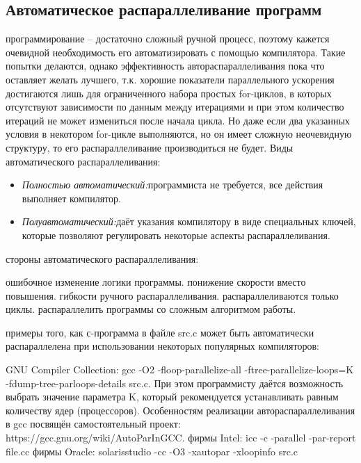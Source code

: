 { %
	\subsection{Автоматическое распараллеливание программ}
	\Large{} программирование – достаточно сложный ручной процесс, поэтому кажется очевидной необходимость его автоматизировать с помощью компилятора. Такие попытки делаются, однако эффективность автораспараллеливания пока что оставляет желать лучшего, т.к. хорошие показатели параллельного ускорения достигаются лишь для ограниченного набора простых for-циклов, в которых отсутствуют зависимости по данным между итерациями и при этом количество итераций не может измениться после начала цикла. Но даже если два указанных условия в некотором for-цикле выполняются, но он имеет сложную неочевидную структуру, то его распараллеливание производиться не будет. Виды автоматического распараллеливания:
	\begin{itemize}
		\item\textit{Полностью автоматический:} программиста не требуется, все действия выполняет компилятор.
		\item\textit{Полуавтоматический:} даёт указания компилятору в виде специальных ключей, которые позволяют регулировать некоторые аспекты распараллеливания.
	\end{itemize}
	 стороны автоматического распараллеливания:
	\begin{itemize}
		 ошибочное изменение логики программы.
		 понижение скорости вместо повышения.
		 гибкости ручного распараллеливания.
		 распараллеливаются только циклы.
		 распараллелить программы со сложным алгоритмом работы.
	\end{itemize}
	 примеры того, как с-программа в файле src.c может быть автоматически распараллелена при использовании некоторых популярных компиляторов:
	\begin{itemize}
		 GNU Compiler Collection:	 
gcc -O2 -floop-parallelize-all -ftree-parallelize-loops=K -fdump-tree-parloops-details src.c. При этом программисту даётся возможность выбрать значение параметра K, который рекомендуется устанавливать равным количеству ядер (процессоров). Особенностям реализации автораспараллеливания в gcc посвящён самостоятельный проект:\\ https://gcc.gnu.org/wiki/AutoParInGCC. 
		 фирмы Intel:	 
icc -c -parallel -par-report file.cc
		 фирмы Oracle:	 
solarisstudio -cc -O3 -xautopar -xloopinfo src.c
	\end{itemize}
}